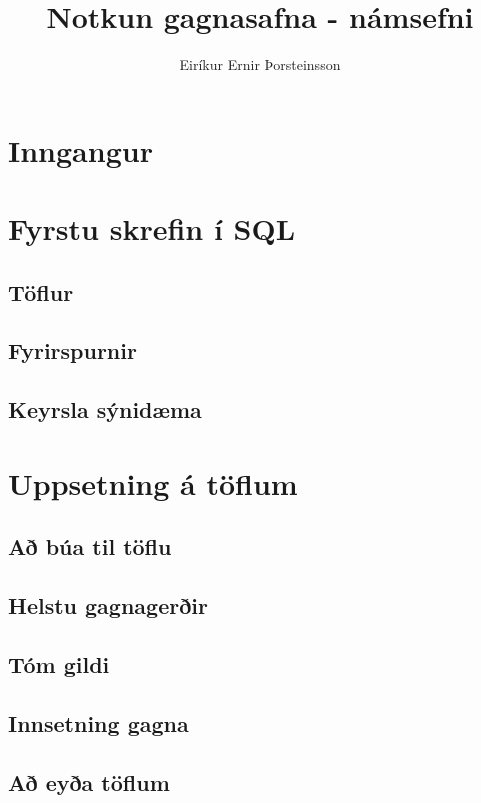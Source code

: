 \documentclass[nohyper,notoc,justified]{tufte-book}
\author{Eiríkur Ernir Þorsteinsson}
\title{Notkun gagnasafna - námsefni}
\date{}
\begin{document}
\setcounter{tocdepth}{2}
\setcounter{secnumdepth}{0}

\maketitle

\tableofcontents

\newpage

\chapter{Inngangur}


\chapter{Fyrstu skrefin í SQL}
\section{Töflur}
\section{Fyrirspurnir}
\section{Keyrsla sýnidæma}

\chapter{Uppsetning á töflum}
\section{Að búa til töflu} %
\section{Helstu gagnagerðir} %
\section{Tóm gildi} %
\section{Innsetning gagna} %
\section{Að eyða töflum} %
\end{document}
